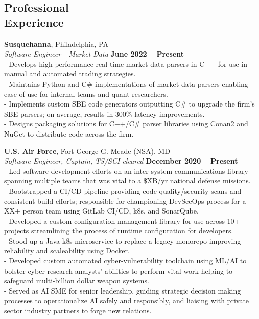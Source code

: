\documentclass[margin,line]{resume}
\begin{document}
\begin{resume}
    \section{\mysidestyle Professional\\Experience}
    \textbf{Susquehanna}, Philadelphia, PA \vspace{2mm}\\\vspace{1mm}%
    \textsl{Software Engineer - Market Data} \hfill \textbf{June 2022 -- Present}\\
    - Develops high-performance real-time market data parsers in C++ for use in manual and automated trading strategies.\vspace{1mm}\\%
    - Maintains Python and C\# implementations of market data parsers enabling ease of use for internal teams and quant researchers.\vspace{1mm}\\%
    - Implements custom SBE code generators outputting C\# to upgrade the firm's SBE parsers; on average, results in 300\% latency improvements.\vspace{1mm}\\%
    - Designs packaging solutions for C++/C\# parser libraries using Conan2 and NuGet to distribute code across the firm.

    \textbf{U.S. Air Force}, Fort George G. Meade (NSA), MD \vspace{2mm}\\\vspace{1mm}%
    \textsl{Software Engineer, Captain, TS/SCI cleared} \hfill \textbf{December 2020 -- Present}\\
    - Led software development efforts on an inter-system communications library spanning multiple teams that was vital to a \$XB/yr national defense missions.\vspace{1mm}\\%
    - Bootstrapped a CI/CD pipeline providing code quality/security scans and consistent build efforts; responsible for championing DevSecOps process for a XX+ person team using GitLab CI/CD, k8s, and SonarQube.\vspace{1mm}\\%
    - Developed a custom configuration management library for use across 10+ projects streamlining the process of runtime configuration for developers.\vspace{1mm}\\%
    - Stood up a Java k8s microservice to replace a legacy monorepo improving reliability and scaleability using Docker.\vspace{1mm}\\%
    - Developed custom automated cyber-vulnerability toolchain using ML/AI to bolster cyber research analysts' abilities to perform vital work helping to safeguard multi-billion dollar weapon systems.\vspace{1mm}\\%
    - Served as AI SME for senior leadership, guiding strategic decision making processes to operationalize AI safely and responsibly, and liaising with private sector industry partners to forge new relations.


\end{resume}
\end{document}
